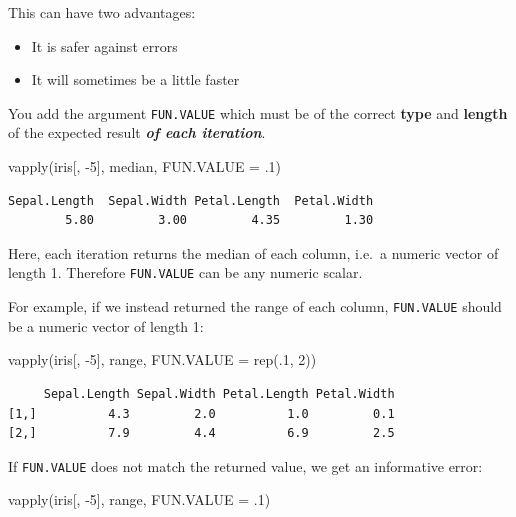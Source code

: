 \documentclass[
]{book}
\newenvironment{Shaded}{\begin{snugshade}}{\end{snugshade}}
\newcommand{\AttributeTok}[1]{\textcolor[rgb]{0.77,0.63,0.00}{#1}}
\newcommand{\DecValTok}[1]{\textcolor[rgb]{0.00,0.00,0.81}{#1}}
\newcommand{\FunctionTok}[1]{\textcolor[rgb]{0.00,0.00,0.00}{#1}}
\newcommand{\NormalTok}[1]{#1}
\newcommand{\SpecialCharTok}[1]{\textcolor[rgb]{0.00,0.00,0.00}{#1}}
\providecommand{\tightlist}{%
  \setlength{\itemsep}{0pt}\setlength{\parskip}{0pt}}
\begin{document}
This can have two advantages:

\begin{itemize}
\tightlist
\item
  It is safer against errors
\item
  It will sometimes be a little faster
\end{itemize}

You add the argument \texttt{FUN.VALUE} which must be of the correct \textbf{type} and \textbf{length} of the expected result \textbf{\emph{of each iteration}}.

\begin{Shaded}
\begin{Highlighting}[]
\FunctionTok{vapply}\NormalTok{(iris[, }\SpecialCharTok{{-}}\DecValTok{5}\NormalTok{], median, }\AttributeTok{FUN.VALUE =}\NormalTok{ .}\DecValTok{1}\NormalTok{)}
\end{Highlighting}
\end{Shaded}

\begin{verbatim}
Sepal.Length  Sepal.Width Petal.Length  Petal.Width 
        5.80         3.00         4.35         1.30 
\end{verbatim}

Here, each iteration returns the median of each column, i.e.~a numeric vector of length 1.
Therefore \texttt{FUN.VALUE} can be any numeric scalar.

For example, if we instead returned the range of each column, \texttt{FUN.VALUE} should be a numeric vector of length 1:

\begin{Shaded}
\begin{Highlighting}[]
\FunctionTok{vapply}\NormalTok{(iris[, }\SpecialCharTok{{-}}\DecValTok{5}\NormalTok{], range, }\AttributeTok{FUN.VALUE =} \FunctionTok{rep}\NormalTok{(.}\DecValTok{1}\NormalTok{, }\DecValTok{2}\NormalTok{))}
\end{Highlighting}
\end{Shaded}

\begin{verbatim}
     Sepal.Length Sepal.Width Petal.Length Petal.Width
[1,]          4.3         2.0          1.0         0.1
[2,]          7.9         4.4          6.9         2.5
\end{verbatim}

If \texttt{FUN.VALUE} does not match the returned value, we get an informative error:

\begin{Shaded}
\begin{Highlighting}[]
\FunctionTok{vapply}\NormalTok{(iris[, }\SpecialCharTok{{-}}\DecValTok{5}\NormalTok{], range, }\AttributeTok{FUN.VALUE =}\NormalTok{ .}\DecValTok{1}\NormalTok{)}
\end{Highlighting}
\end{Shaded}
\end{document}
